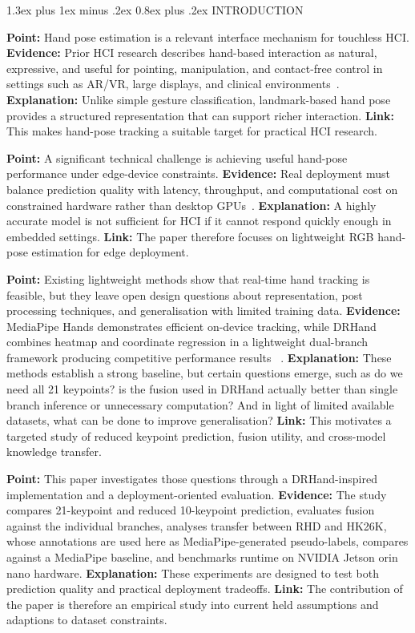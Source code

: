 \documentclass[10pt,letterpaper]{article}
\makeatletter
\renewcommand\section{\@startsection{section}{1}{\z@}%
  {1.3ex plus 1ex minus .2ex}%
  {0.8ex plus .2ex}%
  {\centering\normalfont\small\scshape}}
\makeatother
\begin{document}
\section{INTRODUCTION}

\medskip
\noindent\textbf{Point:} Hand pose estimation is a relevant interface mechanism for touchless HCI.
\textbf{Evidence:} Prior HCI research describes hand-based interaction as natural, expressive, and useful for pointing, manipulation, and contact-free control in settings such as AR/VR, large displays, and clinical environments~\cite{vuletic,wachs,li_vr}.
\textbf{Explanation:} Unlike simple gesture classification, landmark-based hand pose provides a structured representation that can support richer interaction.
\textbf{Link:} This makes hand-pose tracking a suitable target for practical HCI research.

\medskip
\noindent\textbf{Point:} A significant technical challenge is achieving useful hand-pose performance under edge-device constraints.
\textbf{Evidence:} Real deployment must balance prediction quality with latency, throughput, and computational cost on constrained hardware rather than desktop GPUs~\cite{attentionlite,srhandnet,dualreg}.
\textbf{Explanation:} A highly accurate model is not sufficient for HCI if it cannot respond quickly enough in embedded settings.
\textbf{Link:} The paper therefore focuses on lightweight RGB hand-pose estimation for edge deployment.

\medskip
\noindent\textbf{Point:} Existing lightweight methods show that real-time hand tracking is feasible, but they leave open design questions about representation, post processing techniques, and generalisation with limited training data.
\textbf{Evidence:} MediaPipe Hands demonstrates efficient on-device tracking, while DRHand combines heatmap and coordinate regression in a lightweight dual-branch framework producing competitive performance results ~\cite{mediapipe,dualreg}.
\textbf{Explanation:} These methods establish a strong baseline, but certain questions emerge, such as do we need all 21 keypoints? is the fusion used in DRHand actually better than single branch inference or unnecessary computation? And in light of limited available datasets, what can be done to improve generalisation? 
\textbf{Link:} This motivates a targeted study of reduced keypoint prediction, fusion utility, and cross-model knowledge transfer.

\medskip
\noindent\textbf{Point:} This paper investigates those questions through a DRHand-inspired implementation and a deployment-oriented evaluation.
\textbf{Evidence:} The study compares 21-keypoint and reduced 10-keypoint prediction, evaluates fusion against the individual branches, analyses transfer between RHD and HK26K, whose annotations are used here as MediaPipe-generated pseudo-labels, compares against a MediaPipe baseline, and benchmarks runtime on NVIDIA Jetson orin nano hardware.
\textbf{Explanation:} These experiments are designed to test both prediction quality and practical deployment tradeoffs.
\textbf{Link:} The contribution of the paper is therefore an empirical study into current held assumptions and adaptions to dataset constraints.
\end{document}
